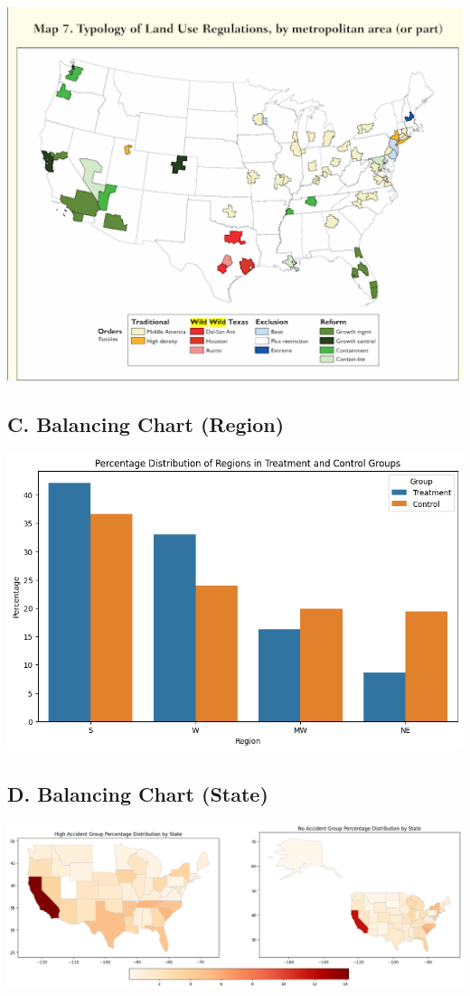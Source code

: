 \documentclass[
  12pt]{article}
\begin{document}
\includegraphics{images/unnamed (1).png}

\subsection{C. Balancing Chart
(Region)}\label{sec-c.-balancing_chart_region}

\includegraphics{images/clipboard-2848566608.png}

\subsection{D. Balancing Chart
(State)}\label{sec-D.balancing_chart_state}

\includegraphics{images/clipboard-2792065255.png}


\renewcommand\refname{References}
  
\end{document}
